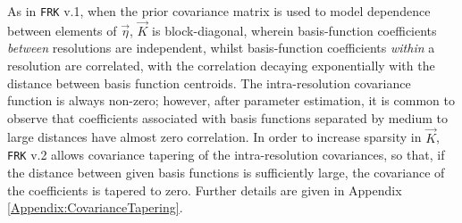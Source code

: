 \documentclass[12pt,a4paper]{article}
\begin{document}
As in \texttt{FRK} v.1, when the prior covariance matrix is used to model dependence between elements of $\vec{\eta}$, $\vec{K}$ is block-diagonal, wherein basis-function coefficients \textit{between} resolutions are independent, whilst basis-function coefficients \textit{within} a resolution are correlated, with the correlation decaying exponentially with the distance between basis function centroids. 
The intra-resolution covariance function is always non-zero; however, after parameter estimation, it is common to observe that coefficients associated with basis functions separated by medium to large distances have almost zero correlation. 
In order to increase sparsity in $\vec{K}$, \texttt{FRK} v.2 allows covariance tapering \citep{Furrer_2006_CovarianceTapering} of the intra-resolution covariances, so that, if the distance between given basis functions is sufficiently large, the covariance of the coefficients is tapered to zero. 
Further details are given in Appendix \ref{Appendix:CovarianceTapering}.
\end{document}
